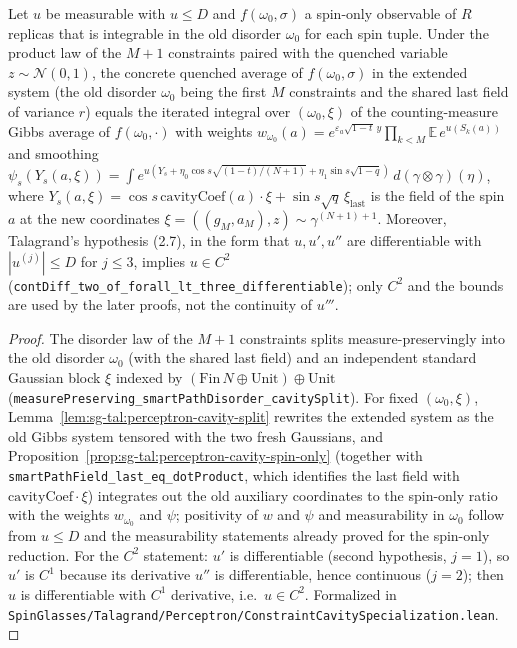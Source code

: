 \begin{theorem}\label{thm:sg-tal:perceptron-cavity-concrete-ratio}
  \leanok
Let $u$ be measurable with $u\le D$ and $f(\omega_0,\sigma)$ a spin-only observable of $R$ replicas that is integrable in the old disorder $\omega_0$ for each spin tuple. Under the product law of the $M+1$ constraints paired with the quenched variable $z\sim\mathcal N(0,1)$, the concrete quenched average of $f(\omega_0,\sigma)$ in the extended system
(the old disorder $\omega_0$ being the first $M$ constraints and the shared last field of variance $r$) equals the iterated integral over $(\omega_0,\xi)$ of the counting-measure Gibbs average of $f(\omega_0,\cdot)$ with weights
$w_{\omega_0}(a)=e^{\varepsilon_a\sqrt{1-t}\,y}\prod_{k<M}\mathbb E\,e^{u(S_k(a))}$ and smoothing $\psi_s(Y_s(a,\xi))=\int e^{u(Y_s+\eta_0\cos s\sqrt{(1-t)/(N+1)}+\eta_1\sin s\sqrt{1-q})}\,d(\gamma\otimes\gamma)(\eta)$, where
$Y_s(a,\xi)=\cos s\,\mathrm{cavityCoef}(a)\cdot\xi+\sin s\sqrt q\,\xi_{\mathrm{last}}$ is the field of the spin $a$ at the new coordinates $\xi=((g_M,a_M),z)\sim\gamma^{(N+1)+1}$.
Moreover, Talagrand's hypothesis (2.7), in the form that $u,u',u''$ are differentiable with $|u^{(j)}|\le D$ for $j\le 3$, implies $u\in C^2$ (\texttt{contDiff\_two\_of\_forall\_lt\_three\_differentiable}); only $C^2$ and the bounds are used by the later proofs, not the continuity of $u'''$.
\end{theorem}
\begin{proof}
  \leanok
The disorder law of the $M+1$ constraints splits measure-preservingly into the old disorder $\omega_0$ (with the shared last field) and an independent standard Gaussian block $\xi$ indexed by $(\mathrm{Fin}\,N\oplus\mathrm{Unit})\oplus\mathrm{Unit}$ (\texttt{measurePreserving\_smartPathDisorder\_cavitySplit}). For fixed $(\omega_0,\xi)$, Lemma~\ref{lem:sg-tal:perceptron-cavity-split}
rewrites the extended system as the old Gibbs system tensored with the two fresh Gaussians, and Proposition~\ref{prop:sg-tal:perceptron-cavity-spin-only} (together with \texttt{smartPathField\_last\_eq\_dotProduct}, which identifies the last field with $\mathrm{cavityCoef}\cdot\xi$) integrates out
the old auxiliary coordinates to the spin-only ratio with the weights $w_{\omega_0}$ and $\psi$; positivity of $w$ and $\psi$ and measurability in $\omega_0$ follow from $u\le D$ and the measurability statements already proved for the spin-only reduction.
For the $C^2$ statement: $u'$ is differentiable (second hypothesis, $j=1$), so $u'$ is $C^1$ because its derivative $u''$ is differentiable, hence continuous ($j=2$); then $u$ is differentiable with $C^1$ derivative, i.e.\ $u\in C^2$.
Formalized in \texttt{SpinGlasses/Talagrand/Perceptron/ConstraintCavitySpecialization.lean}.
\end{proof}

